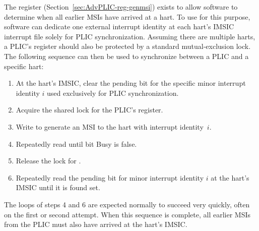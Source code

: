 The  register (Section~\ref{sec:AdvPLIC-reg-genmsi}) exists
to allow software to determine when all earlier MSIs have arrived at a
hart.
To use  for this purpose, software can dedicate one external
interrupt identity at each hart's IMSIC interrupt file solely for PLIC
synchronization.
Assuming there are multiple harts, a PLIC's  register should
also be protected by a standard mutual-exclusion lock.
The following sequence can then be used to synchronize between a PLIC
and a specific hart:
\begin{enumerate}

\item
At the hart's IMSIC, clear the pending bit for the specific minor
interrupt identity $i$ used exclusively for PLIC synchronization.

\item
Acquire the shared lock for the PLIC's  register.

\item
Write  to generate an MSI to the hart with interrupt
identity~$i$.

\item
Repeatedly read  until bit Busy is false.

\item
Release the lock for .

\item
Repeatedly read the pending bit for minor interrupt identity $i$ at the
hart's IMSIC until it is found set.

\end{enumerate}
The loops of steps 4 and 6 are expected normally to succeed very
quickly, often on the first or second attempt.
When this sequence is complete, all earlier MSIs from the PLIC must
also have arrived at the hart's IMSIC.

